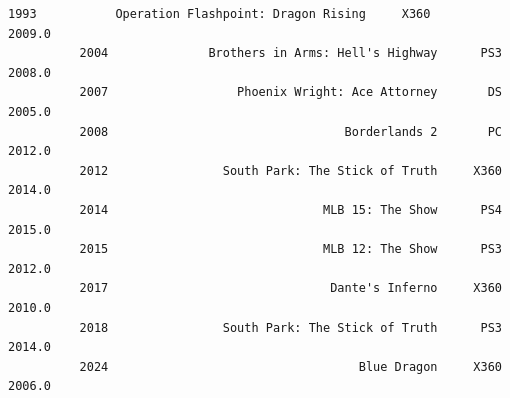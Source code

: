 \documentclass[11pt]{article}
\begin{document}
\begin{Verbatim}[commandchars=\\\{\}]
          1993           Operation Flashpoint: Dragon Rising     X360           2009.0   
          2004              Brothers in Arms: Hell's Highway      PS3           2008.0   
          2007                  Phoenix Wright: Ace Attorney       DS           2005.0   
          2008                                 Borderlands 2       PC           2012.0   
          2012                South Park: The Stick of Truth     X360           2014.0   
          2014                              MLB 15: The Show      PS4           2015.0   
          2015                              MLB 12: The Show      PS3           2012.0   
          2017                               Dante's Inferno     X360           2010.0   
          2018                South Park: The Stick of Truth      PS3           2014.0   
          2024                                   Blue Dragon     X360           2006.0   
          

\end{Verbatim}
\end{document}
